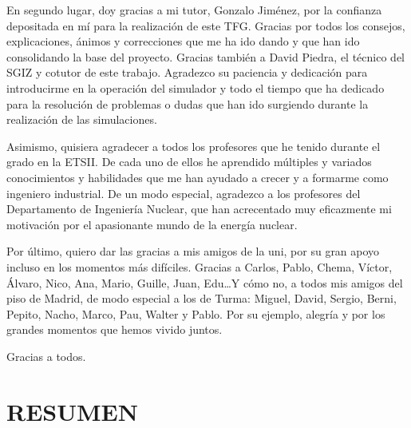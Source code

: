 \documentclass[a4paper, 11pt, spanish, twoside]{article}
\begin{document}
En segundo lugar, doy gracias a mi tutor, Gonzalo Jiménez, por la confianza depositada en mí para la realización de este TFG. Gracias por todos los consejos, explicaciones, ánimos y correcciones que me ha ido dando y que han ido consolidando la base del proyecto.
Gracias también a David Piedra, el técnico del SGIZ y cotutor de este trabajo. Agradezco su paciencia y dedicación para introducirme en la operación del simulador y todo el tiempo que ha dedicado para la resolución de problemas o dudas que han ido surgiendo durante la realización de las simulaciones.

Asimismo, quisiera agradecer a todos los profesores que he tenido durante el grado en la ETSII. De cada uno de ellos he aprendido múltiples y variados conocimientos y habilidades que me han ayudado a crecer y a formarme como ingeniero industrial. De un modo especial, agradezco a los profesores del Departamento de Ingeniería Nuclear, que han acrecentado muy eficazmente mi motivación por el apasionante mundo de la energía nuclear.

Por último, quiero dar las gracias a mis amigos de la uni, por su gran apoyo incluso en los momentos más difíciles. Gracias a Carlos, Pablo, Chema, Víctor, Álvaro, Nico, Ana, Mario, Guille, Juan, Edu\dots Y cómo no, a todos mis amigos del piso de Madrid, de modo especial a los de Turma: Miguel, David, Sergio, Berni, Pepito, Nacho, Marco, Pau, Walter y Pablo. Por su ejemplo, alegría y por los grandes momentos que hemos vivido juntos.

Gracias a todos.

\afterpage{\blankpage} %

\newpage
\section*{RESUMEN} %
\end{document}
